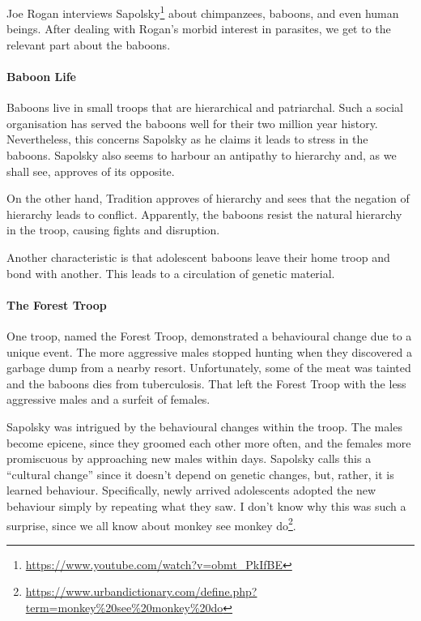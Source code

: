 Joe Rogan interviews Sapolsky\footnote{\url{https://www.youtube.com/watch?v=obmt_PkIfBE}} about chimpanzees, baboons, and even human beings. After dealing with Rogan's morbid interest in parasites, we get to the relevant part about the baboons.

\paragraph{Baboon Life}


Baboons live in small troops that are hierarchical and patriarchal. Such a social organisation has served the baboons well for their two million year history. Nevertheless, this concerns Sapolsky as he claims it leads to stress in the baboons. Sapolsky also seems to harbour an antipathy to hierarchy and, as we shall see, approves of its opposite.

On the other hand, Tradition approves of hierarchy and sees that the negation of hierarchy leads to conflict. Apparently, the baboons resist the natural hierarchy in the troop, causing fights and disruption.

Another characteristic is that adolescent baboons leave their home troop and bond with another. This leads to a circulation of genetic material.

\paragraph{The Forest Troop}


One troop, named the Forest Troop, demonstrated a behavioural change due to a unique event. The more aggressive males stopped hunting when they discovered a garbage dump from a nearby resort. Unfortunately, some of the meat was tainted and the baboons dies from tuberculosis. That left the Forest Troop with the less aggressive males and a surfeit of females.

Sapolsky was intrigued by the behavioural changes within the troop. The males become epicene, since they groomed each other more often, and the females more promiscuous by approaching new males within days. Sapolsky calls this a ``cultural change'' since it doesn't depend on genetic changes, but, rather, it is learned behaviour. Specifically, newly arrived adolescents adopted the new behaviour simply by repeating what they saw. I don't know why this was such a surprise, since we all know about monkey see monkey do\footnote{\url{https://www.urbandictionary.com/define.php?term=monkey\%20see\%20monkey\%20do}}.

